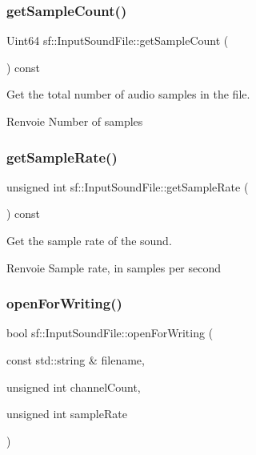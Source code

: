 \subsubsection{\texorpdfstring{get\+Sample\+Count()}{getSampleCount()}}
{\footnotesize\ttfamily Uint64 sf\+::\+Input\+Sound\+File\+::get\+Sample\+Count (\begin{DoxyParamCaption}{ }\end{DoxyParamCaption}) const}



Get the total number of audio samples in the file. 

\begin{DoxyReturn}{Renvoie}
Number of samples 
\end{DoxyReturn}
\mbox{\label{classsf_1_1InputSoundFile_a6b8177e40dd8020752f6d52f96b774c3}} 
\subsubsection{\texorpdfstring{get\+Sample\+Rate()}{getSampleRate()}}
{\footnotesize\ttfamily unsigned int sf\+::\+Input\+Sound\+File\+::get\+Sample\+Rate (\begin{DoxyParamCaption}{ }\end{DoxyParamCaption}) const}



Get the sample rate of the sound. 

\begin{DoxyReturn}{Renvoie}
Sample rate, in samples per second 
\end{DoxyReturn}
\mbox{\label{classsf_1_1InputSoundFile_a84f32fdf5fa619538506395c3c5a030a}} 
\subsubsection{\texorpdfstring{open\+For\+Writing()}{openForWriting()}}
{\footnotesize\ttfamily bool sf\+::\+Input\+Sound\+File\+::open\+For\+Writing (\begin{DoxyParamCaption}\item[{const std\+::string \&}]{filename,  }\item[{unsigned int}]{channel\+Count,  }\item[{unsigned int}]{sample\+Rate }\end{DoxyParamCaption})}



